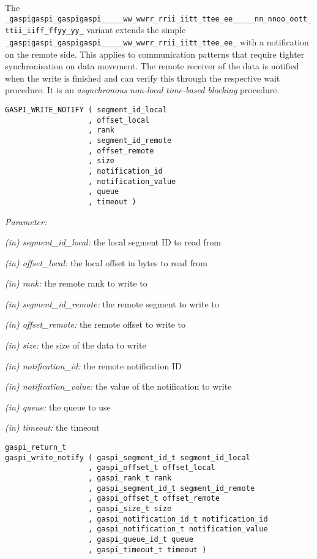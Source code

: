 \documentclass[a4paper]{article}
\makeatletter
\newlength{\st}\setlength{\st}{0pt}
\newcommand{\zerowsep}{\hskip 0pt plus 0.1pt minus 0.1pt}
\newcommand{\ZSEP}[1]{\ifx#1\@@@EOZ@@@\let\next\relax\else\ifx#1\_#1\zerowsep\else#1\fi\let\next\ZSEP\fi\next}
\newcommand{\zsep}[1]{\ZSEP{}#1\@@@EOZ@@@}
\newcommand{\gaspiprefix}{gaspi}
\newcommand{\function}[1]{{\tt #1}}
\newcommand{\parameter}[1]{{\it #1}}
\newcommand{\gaspifunction}[1]{\function{\protect\zsep{\gaspiprefix\_#1}}}
\newenvironment{cbox}[1]
{\newcommand\colboxcolor{#1}\begin{lrbox}{\riddlebox}\begin{minipage}{\dimexpr\columnwidth-2\fboxsep\relax}}
{\end{minipage}\end{lrbox}\begin{center}\colorbox[HTML]{\colboxcolor}{\usebox{\riddlebox}}\end{center}}
\newcommand{\shortlistbegin}[1]{\begin{trivlist}\setlength{\itemsep}{0pt}\item[]\emph{#1:}}
\newcommand{\shortlistitem}[1]{\item[]#1}
\newcommand{\shortlistend}{\end{trivlist}}
\newenvironment{FDef}{\begin{trivlist}\item[]}{\end{trivlist}}
\newenvironment{FDefSign}{\begin{cbox}{EEEEEE}}{\end{cbox}}
\newcommand{\parameterlistbegin}{\shortlistbegin{Parameter}}
\newcommand{\parameterlistend}{\shortlistend}
\newcommand{\parameterlistitem}[3]{\shortlistitem{\parameter{(#1) #2:} {#3}}}
\newcommand{\gaspisemantic}[1]{{\emph{#1}}}
\makeatother
\begin{document}
The \gaspifunction{write\_notify} variant extends the simple
\gaspifunction{write} with a notification on the remote
side. This applies to communication patterns that require tighter
synchronisation on data movement. The remote receiver of the data is
notified when the write is finished and can verify this through the
respective wait procedure. It is an \gaspisemantic{asynchronous}
\gaspisemantic{non-local} \gaspisemantic{time-based blocking}
procedure.

\begin{FDef}

\begin{FDefSign}
\begin{verbatim}
GASPI_WRITE_NOTIFY ( segment_id_local
                   , offset_local
                   , rank
                   , segment_id_remote
                   , offset_remote
                   , size
                   , notification_id
                   , notification_value
                   , queue
                   , timeout )
\end{verbatim}
\end{FDefSign}

\parameterlistbegin
\parameterlistitem{in}{segment\_id\_local}{the local segment ID to read from}
\parameterlistitem{in}{offset\_local}{the local offset in bytes to read from}
\parameterlistitem{in}{rank}{the remote rank to write to}
\parameterlistitem{in}{segment\_id\_remote}{the remote segment to write to}
\parameterlistitem{in}{offset\_remote}{the remote offset to write to}
\parameterlistitem{in}{size}{the size of the data to write}
\parameterlistitem{in}{notification\_id}{the remote notification ID}
\parameterlistitem{in}{notification\_value}{the value of the notification to write}
\parameterlistitem{in}{queue}{the queue to use}
\parameterlistitem{in}{timeout}{the timeout}
\parameterlistend


\begin{FDefSign}
\begin{verbatim}
gaspi_return_t
gaspi_write_notify ( gaspi_segment_id_t segment_id_local
                   , gaspi_offset_t offset_local
                   , gaspi_rank_t rank
                   , gaspi_segment_id_t segment_id_remote
                   , gaspi_offset_t offset_remote
                   , gaspi_size_t size
                   , gaspi_notification_id_t notification_id
                   , gaspi_notification_t notification_value
                   , gaspi_queue_id_t queue
                   , gaspi_timeout_t timeout )
\end{verbatim}
\end{FDefSign}



\end{FDef}
\end{document}
